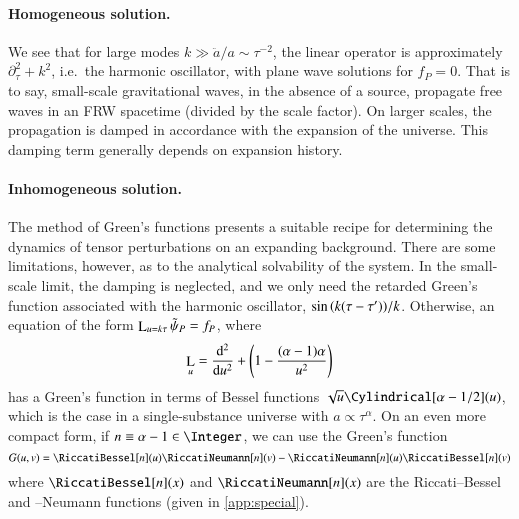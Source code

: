 
    \paragraph{Homogeneous solution.} %
    We see that for large modes $k \gg \ddot{a}/a \sim \tau^{-2}$, the linear operator is approximately $\partial_\tau^2 + k^2$, i.e.~the harmonic oscillator, with plane wave solutions for $f_P=0$. That is to say, small-scale gravitational waves, in the absence of a source, propagate free waves in an FRW spacetime (divided by the scale factor). On larger scales, the propagation is damped in accordance with the expansion of the universe. This damping term generally depends on expansion history.


    


    \paragraph{Inhomogeneous solution.} %
    The method of Green's functions presents a suitable recipe for determining the dynamics of tensor perturbations on an expanding background. There are some limitations, however, as to the analytical solvability of the system. In the small-scale limit, the damping is neglected, and we only need the retarded Green's function associated with the harmonic oscillator, $\sin{{\left( k(\tau-\tau') \right)}}/k$. Otherwise, an equation of the form $\mathop{\mathrm{L}}_{u=k\tau} \tilde{\psi}_P=f_P$, where
    \begin{equation}
        \mathop{\mathrm{L}}_u = \dv[2]{}{u} + {\left( 1 - \frac{(\alpha-1)\alpha}{u^2} \right)}
    \end{equation}
    has a Green's function in terms of Bessel functions $\sqrt{u}\Cylindrical[\alpha-1/2](u)$, which is the case in a single-substance universe with $a \propto \tau^\alpha$. On an even more compact form, if $n\equiv\alpha-1 \in \Integer$, we can use the Green's function
    \begin{equation}\label{eq:GR:gws:Greens_function_n}
        G(u,v) = \RiccatiBessel[n](u)\RiccatiNeumann[n](v) - \RiccatiNeumann[n](u)\RiccatiBessel[n](v)
    \end{equation}
    where $\RiccatiBessel[n](x)$ and $\RiccatiNeumann[n](x)$ are the Riccati--Bessel and --Neumann functions (given in \cref{app:special}).
        
